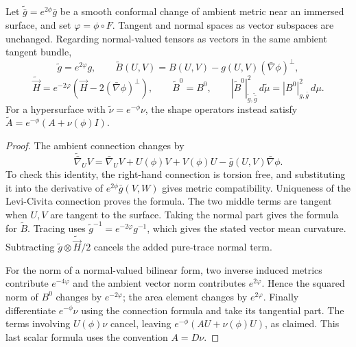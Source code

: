 \begin{lemma}\label{lem:conformal-second-fundamental-form}
Let $\widetilde{\bar g}=e^{2\phi}\bar g$ be a smooth conformal change of ambient metric near an immersed surface, and set $\varphi=\phi\circ F$. Tangent and normal spaces as vector subspaces are unchanged. Regarding normal-valued tensors as vectors in the same ambient tangent bundle,
\[
 \widetilde g=e^{2\varphi}g,\qquad
 \widetilde B(U,V)=B(U,V)-g(U,V)(\bar\nabla\phi)^\perp,
\]
\[
 \widetilde{\vec H}=e^{-2\varphi}(\vec H-2(\bar\nabla\phi)^\perp),
 \qquad \widetilde B^0=B^0,
 \qquad |\widetilde B^0|_{\widetilde g,\widetilde{\bar g}}^2\,d\widetilde\mu=|B^0|_{g,\bar g}^2\,d\mu.
\]
For a hypersurface with $\widetilde\nu=e^{-\phi}\nu$, the shape operators instead satisfy $\widetilde A=e^{-\phi}(A+\nu(\phi)I)$.
\end{lemma}
\begin{proof}
The ambient connection changes by
\[
 \widetilde{\bar\nabla}_UV=\bar\nabla_UV+U(\phi)V+V(\phi)U-\bar g(U,V)\bar\nabla\phi.
\]
To check this identity, the right-hand connection is torsion free, and substituting it into the derivative of $e^{2\phi}\bar g(V,W)$ gives metric compatibility. Uniqueness of the Levi-Civita connection proves the formula. The two middle terms are tangent when $U,V$ are tangent to the surface. Taking the normal part gives the formula for $\widetilde B$. Tracing uses $\widetilde g^{-1}=e^{-2\varphi}g^{-1}$, which gives the stated vector mean curvature. Subtracting $\widetilde g\otimes\widetilde{\vec H}/2$ cancels the added pure-trace normal term.

For the norm of a normal-valued bilinear form, two inverse induced metrics contribute $e^{-4\varphi}$ and the ambient vector norm contributes $e^{2\varphi}$. Hence the squared norm of $B^0$ changes by $e^{-2\varphi}$; the area element changes by $e^{2\varphi}$. Finally differentiate $e^{-\phi}\nu$ using the connection formula and take its tangential part. The terms involving $U(\phi)\nu$ cancel, leaving $e^{-\phi}(AU+\nu(\phi)U)$, as claimed. This last scalar formula uses the convention $A=D\nu$.
\end{proof}


